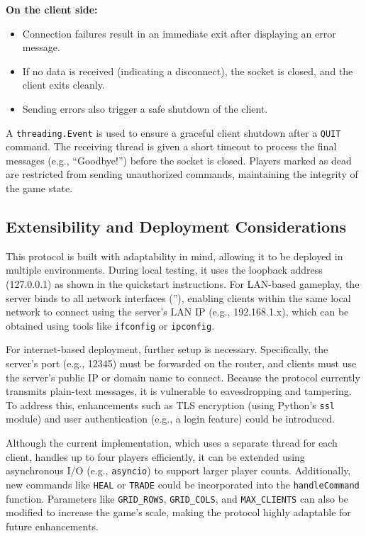 \documentclass{article}
\begin{document}
\textbf{On the client side:}

\begin{itemize}
    \item Connection failures result in an immediate exit after displaying an error message.
    \item If no data is received (indicating a disconnect), the socket is closed, and the client exits cleanly.
    \item Sending errors also trigger a safe shutdown of the client.
\end{itemize}

A \texttt{threading.Event} is used to ensure a graceful client shutdown after a \texttt{QUIT} command. The receiving thread is given a short timeout to process the final messages (e.g., “Goodbye!”) before the socket is closed. Players marked as dead are restricted from sending unauthorized commands, maintaining the integrity of the game state.

\subsection{Extensibility and Deployment Considerations}

This protocol is built with adaptability in mind, allowing it to be deployed in multiple environments. During local testing, it uses the loopback address (127.0.0.1) as shown in the quickstart instructions. For LAN-based gameplay, the server binds to all network interfaces (''), enabling clients within the same local network to connect using the server’s LAN IP (e.g., 192.168.1.x), which can be obtained using tools like \texttt{ifconfig} or \texttt{ipconfig}.

For internet-based deployment, further setup is necessary. Specifically, the server's port (e.g., 12345) must be forwarded on the router, and clients must use the server’s public IP or domain name to connect. Because the protocol currently transmits plain-text messages, it is vulnerable to eavesdropping and tampering. To address this, enhancements such as TLS encryption (using Python’s \texttt{ssl} module) and user authentication (e.g., a login feature) could be introduced.

Although the current implementation, which uses a separate thread for each client, handles up to four players efficiently, it can be extended using asynchronous I/O (e.g., \texttt{asyncio}) to support larger player counts. Additionally, new commands like \texttt{HEAL} or \texttt{TRADE} could be incorporated into the \texttt{handleCommand} function. Parameters like \texttt{GRID\_ROWS}, \texttt{GRID\_COLS}, and \texttt{MAX\_CLIENTS} can also be modified to increase the game’s scale, making the protocol highly adaptable for future enhancements.
\end{document}
